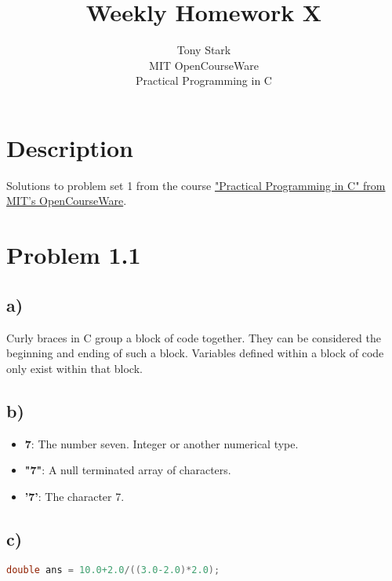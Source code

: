 \documentclass[12pt]{article}
\begin{document}
 
 
\title{Weekly Homework X}%
\author{Tony Stark\\ %
MIT OpenCourseWare \\
Practical Programming in C} %
 
\maketitle
\section*{Description}
Solutions to problem set 1 from the course 
\href{http://ocw.mit.edu/courses/electrical-engineering-and-computer-science/6-087-practical-programming-in-c-january-iap-2010/index.htm}{"Practical Programming in C" from MIT's OpenCourseWare}.


\section*{Problem 1.1}
\subsection*{a)}
Curly braces in C group a block of code together. They can be considered the beginning and ending of such a block. Variables defined within a block of code only exist within that block.

\subsection*{b)}
\begin{itemize}
\item \textbf{7}: The number seven. Integer or another numerical type.
\item \textbf{"7"}: A null terminated array of characters.
\item \textbf{'7'}: The character 7.
\end{itemize}

\subsection*{c)}
\begin{lstlisting}[frame=single, language=C]
double ans = 10.0+2.0/((3.0-2.0)*2.0);
\end{lstlisting}
\end{document}

